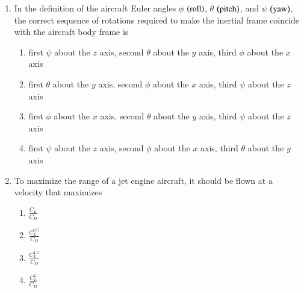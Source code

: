 \documentclass[journal]{IEEEtran}
\begin{document}
\begin{enumerate}[start=35]
\item In the definition of the aircraft Euler angles $\phi$ $\left(\text{roll}\right)$, $\theta$ $\left(\text{pitch}\right)$, and $\psi$ $\left(\text{yaw}\right)$, the correct sequence of rotations required to make the inertial frame coincide with the aircraft body frame is
\begin{enumerate}
    \item first $\psi$ about the $z$ axis, second $\theta$ about the $y$ axis, third $\phi$ about the $x$ axis
    \item first $\theta$ about the $y$ axis, second $\phi$ about the $x$ axis, third $\psi$ about the $z$ axis
    \item first $\phi$ about the $x$ axis, second $\theta$ about the $y$ axis, third $\psi$ about the $z$ axis
    \item first $\psi$ about the $z$ axis, second $\phi$ about the $x$ axis, third $\theta$ about the $y$ axis
\end{enumerate}

\item To maximize the range of a jet engine aircraft, it should be flown at a velocity that maximizes
\begin{enumerate}
    \item $\frac{C_L}{C_D}$
    \item $\frac{C_{L}^{0.5}}{C_D}$
    \item $\frac{C_{L}^{1.5}}{C_D}$
    \item $\frac{C_{L}^{2}}{C_{D}}$
\end{enumerate}


\end{enumerate}
\end{document}
